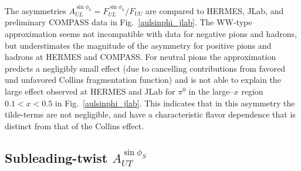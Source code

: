 \documentclass[a4paper,11pt]{article}
\newcommand{\blue}[1]{{\color{blue} #1}}
\newcommand{\ps}[1]{\blue{#1}}
\begin{document}
The asymmetries $A_{UL}^{\sin\phi_h}=F_{UL}^{\sin\phi_h}/F_{UU}$ are compared
to HERMES, JLab, and preliminary COMPASS data in Fig.~\ref{aulsinphi_jlab}.
The WW-type approximation \ps{seems not incompatible with data for negative
pions and hadrons, but understimates the magnitude of the asymmetry for
positive pions and hadrons at HERMES and COMPASS. For neutral pions the
approximation predicts a negligibly small effect (due to cancelling
contributions from favored und unfavored Collins fragmentation function)
and is} not able to explain the large effect
observed at HERMES and JLab for $\pi^0$ in the large--$x$ region
$0.1< x < 0.5$ in Fig.~\ref{aulsinphi_jlab}.
This indicates that in this asymmetry the
tilde-terms are not negligible, and have a characteristic flavor
dependence that is distinct from that of the Collins effect.



\subsection{\boldmath Subleading-twist  $A_{UT}^{\sin\phi_S}$}
\label{Sec-7.6:FUTsinphiS}
\end{document}
